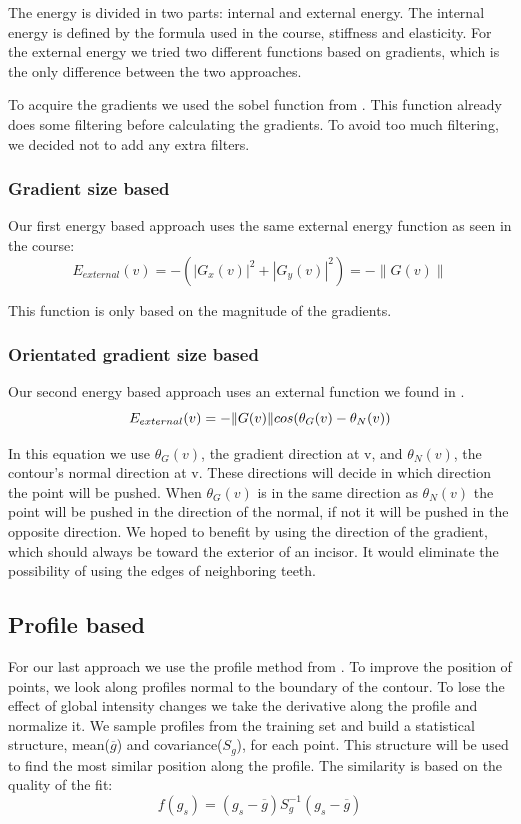 \documentclass[a4paper,10pt]{article}
\begin{document}
The energy is divided in two parts: internal and external energy. The internal energy is defined by the formula used in the course, stiffness and elasticity. For the external energy we tried two different functions based on gradients, which is the only difference between the two approaches.

To acquire the gradients we used the sobel function from \cite{PythonFilters}. This function already does some filtering before calculating the gradients. To avoid too much filtering, we decided not to add any extra filters.

\subsubsection{Gradient size based}
Our first energy based approach uses the same external energy function as seen in the course:
\begin{equation}
E_{external}(v) = - ( |G_{x}(v)|^2 + |G_{y}(v)|^2 ) = -  \|G(v)\|
\end{equation}

This function is only based on the magnitude of the gradients.

\subsubsection{Orientated gradient size based}
Our second energy based approach uses an external function we found in \cite{OrientatedEnergy}. 
\begin{equation}
E_{external}(v) = -  \|G(v)\|cos(\theta_{G}(v) - \theta_{N}(v))\\
\end{equation}

In this equation we use $\theta_{G}(v)$, the gradient direction at v, and $\theta_{N}(v)$, the contour's normal direction at v. These directions will decide in which direction the point will be pushed. When $\theta_{G}(v)$ is in the same direction as  $\theta_{N}(v)$ the point will be pushed in the direction of the normal, if not it will be pushed in the opposite direction. We hoped to benefit by using the direction of the gradient, which should always be toward the exterior of an incisor. It would eliminate the possibility of using the edges of neighboring teeth.

\subsection{Profile based}\label{sec:fit_deriv}
For our last approach we use the profile method from \cite{TemplateAlgorithm}. To improve the position of points, we look along profiles normal to the boundary of the contour. To lose the effect of global intensity changes we take the derivative along the profile and normalize it. We sample profiles from the training set and build a statistical structure, mean($\overline{g}$) and covariance($S_{g}$), for each point. This structure will be used to find the most similar position along the profile. The similarity is based on the quality of the fit:
\begin{equation}
f(g_{s}) = (g_{s} - \overline{g}) S_{g}^{-1} (g_{s}-\overline{g})
\end{equation}
\end{document}
